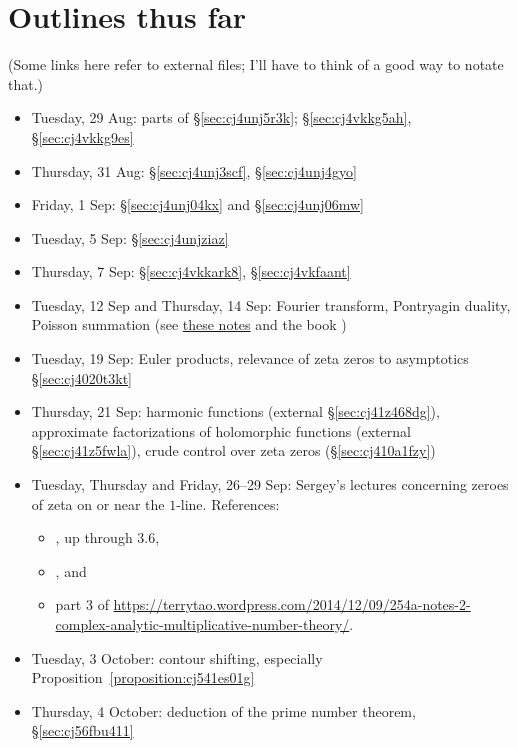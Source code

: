 \documentclass[reqno]{amsart}  \numberwithin{theorem}{section} \numberwithin{equation}{section}
\begin{document}
\section{Outlines thus far}
(Some links here refer to external files; I'll have to think of a good way to notate that.)
\begin{itemize}
\item Tuesday, 29 Aug: parts of \S\ref{sec:cj4unj5r3k}; \S\ref{sec:cj4vkkg5ah}, \S\ref{sec:cj4vkkg9es}
\item Thursday, 31 Aug: \S\ref{sec:cj4unj3scf}, \S\ref{sec:cj4unj4gyo}
\item Friday, 1 Sep: \S\ref{sec:cj4unj04kx} and \S\ref{sec:cj4unj06mw}
\item Tuesday, 5 Sep: \S\ref{sec:cj4unjziaz}
\item Thursday, 7 Sep: \S\ref{sec:cj4vkkark8}, \S\ref{sec:cj4vkfaant}
\item Tuesday, 12 Sep and Thursday, 14 Sep: Fourier transform, Pontryagin duality, Poisson summation (see \href{20230919T144827--discrete-fourier-transform.pdf}{these notes} and the book \cite{MR3289059})
\item Tuesday, 19 Sep: Euler products, relevance of zeta zeros to asymptotics \S\ref{sec:cj4020t3kt}
\item Thursday, 21 Sep: harmonic functions (external \S\ref{sec:cj41z468dg}), approximate factorizations of holomorphic functions (external \S\ref{sec:cj41z5fwla}), crude control over zeta zeros (\S\ref{sec:cj410a1fzy})
\item Tuesday, Thursday and Friday, 26--29 Sep: Sergey's lectures concerning zeroes of zeta on or near the $1$-line.  References:
  \begin{itemize}
  \item \cite[Chapter III]{MR882550}, up through 3.6,
  \item \cite[Chapter 13]{Dav80}, and
  \item part 3 of \href{these notes}{https://terrytao.wordpress.com/2014/12/09/254a-notes-2-complex-analytic-multiplicative-number-theory/}.
  \end{itemize}
\item Tuesday, 3 October: contour shifting, especially Proposition~\ref{proposition:cj541es01g}
\item Thursday, 4 October: deduction of the prime number theorem, \S\ref{sec:cj56fbu411}
\end{itemize}
\end{document}
